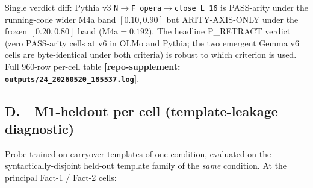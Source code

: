 \documentclass[11pt,letterpaper]{article}
\begin{document}
\begin{table}[h]
  \centering
  \small
  \caption{v6 sweep PASS-arity verdict tally by model, scope, and
  criterion (running-code vs frozen pre-registered). The single
  verdict diff is documented in the text below.}
  \label{tab:appC}
\end{table}

Single verdict diff: Pythia v3 \texttt{N$\to$F opera$\to$close L\,16}
is PASS-arity under the running-code wider M4a band
$[0.10, 0.90]$ but ARITY-AXIS-ONLY under the frozen $[0.20, 0.80]$
band ($\text{M4a} = 0.192$). The headline P\_RETRACT verdict (zero
PASS-arity cells at v6 in OLMo and Pythia; the two emergent Gemma
v6 cells are byte-identical under both criteria) is robust to which
criterion is used. Full 960-row per-cell table
\textbf{[repo-supplement: \texttt{outputs/24\_20260520\_185537.log}]}.

\subsection*{D.\ \ M1-heldout per cell (template-leakage diagnostic)}
Probe trained on carryover templates of one condition, evaluated on
the syntactically-disjoint held-out template family of the
\emph{same} condition. At the principal Fact-1 / Fact-2 cells:
\end{document}

